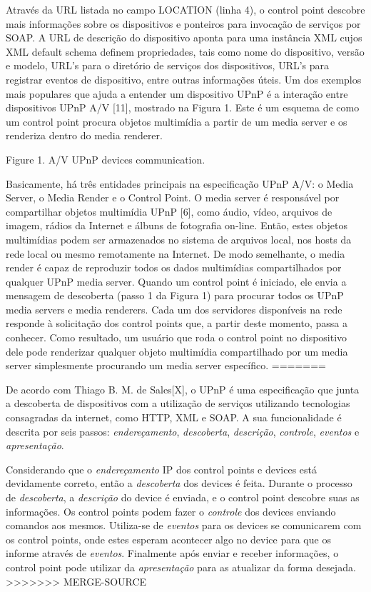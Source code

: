 \documentclass[a4paper]{sbgames}               %
\begin{document}
Através da URL listada no campo LOCATION (linha 4), o control point descobre mais informações sobre os dispositivos e ponteiros para invocação de serviços por SOAP. A URL de descrição do dispositivo aponta para uma instância XML cujos XML default schema definem propriedades, tais como nome do dispositivo, versão e modelo, URL's para o diretório de serviços dos dispositivos, URL's para registrar eventos de dispositivo, entre outras informações úteis. Um dos exemplos mais populares que ajuda a entender um dispositivo UPnP é a interação entre dispositivos UPnP A/V [11], mostrado na Figura 1. Este é um esquema de como um control point procura objetos multimídia a partir de um media server e os renderiza dentro do media renderer.

Figure 1. A/V UPnP devices communication.

Basicamente, há três entidades principais na especificação UPnP A/V: o Media Server, o Media Render e o Control Point. O media server é responsável por compartilhar objetos multimídia UPnP [6], como áudio, vídeo, arquivos de imagem, rádios da Internet e álbuns de fotografia on-line. Então, estes objetos multimídias podem ser armazenados no sistema de arquivos local, nos hosts da rede local ou mesmo remotamente na Internet. De modo semelhante, o media render é capaz de reproduzir todos os dados multimídias compartilhados por qualquer UPnP media server. Quando um control point é iniciado, ele envia a mensagem de descoberta (passo 1 da Figura 1) para procurar todos os UPnP media servers e media renderers. Cada um dos servidores disponíveis na rede responde à solicitação dos control points que, a partir deste momento, passa a conhecer. Como resultado, um usuário que roda o control point no dispositivo dele pode renderizar qualquer objeto multimídia compartilhado por um media server simplesmente procurando um media server específico.
=======

De acordo com Thiago B. M. de Sales[X], o UPnP é uma especificação que junta a descoberta de dispositivos com a utilização de serviços utilizando tecnologias consagradas da internet, como HTTP, XML e SOAP. A sua funcionalidade é descrita por seis passos: \emph{endereçamento}, \emph{descoberta}, \emph{descrição}, \emph{controle}, \emph{eventos} e \emph{apresentação}.

Considerando que o \emph{endereçamento} IP dos control points e devices está devidamente correto, então a \emph{descoberta} dos devices é feita. Durante o processo de \emph{descoberta}, a \emph{descrição} do device é enviada, e o control point descobre suas as informações. Os control points podem fazer o \emph{controle} dos devices enviando comandos aos mesmos. Utiliza-se de \emph{eventos} para os devices se comunicarem com os control points, onde estes esperam acontecer algo no device para que os informe através de \emph{eventos}. Finalmente após enviar e receber informações, o control point pode utilizar da \emph{apresentação} para as atualizar da forma desejada.
>>>>>>> MERGE-SOURCE
\end{document}
